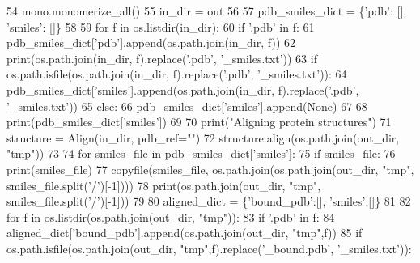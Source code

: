 \begin{DoxyCode}
54         mono.monomerize\_all()
55         in\_dir = out
56 
57     pdb\_smiles\_dict = \{\textcolor{stringliteral}{'pdb'}: [], \textcolor{stringliteral}{'smiles'}: []\}
58 
59     \textcolor{keywordflow}{for} f \textcolor{keywordflow}{in} os.listdir(in\_dir):
60         \textcolor{keywordflow}{if} \textcolor{stringliteral}{'.pdb'} \textcolor{keywordflow}{in} f:
61             pdb\_smiles\_dict[\textcolor{stringliteral}{'pdb'}].append(os.path.join(in\_dir, f))
62             print(os.path.join(in\_dir, f).replace(\textcolor{stringliteral}{'.pdb'}, \textcolor{stringliteral}{'\_smiles.txt'}))
63             \textcolor{keywordflow}{if} os.path.isfile(os.path.join(in\_dir, f).replace(\textcolor{stringliteral}{'.pdb'}, \textcolor{stringliteral}{'\_smiles.txt'})):
64                 pdb\_smiles\_dict[\textcolor{stringliteral}{'smiles'}].append(os.path.join(in\_dir, f).replace(\textcolor{stringliteral}{'.pdb'}, \textcolor{stringliteral}{'\_smiles.txt'}))
65             \textcolor{keywordflow}{else}:
66                 pdb\_smiles\_dict[\textcolor{stringliteral}{'smiles'}].append(\textcolor{keywordtype}{None})
67 
68     print(pdb\_smiles\_dict[\textcolor{stringliteral}{'smiles'}])
69 
70     print(\textcolor{stringliteral}{"Aligning protein structures"})
71     structure = Align(in\_dir, pdb\_ref=\textcolor{stringliteral}{""})
72     structure.align(os.path.join(out\_dir, \textcolor{stringliteral}{"tmp"}))
73 
74     \textcolor{keywordflow}{for} smiles\_file \textcolor{keywordflow}{in} pdb\_smiles\_dict[\textcolor{stringliteral}{'smiles'}]:
75         \textcolor{keywordflow}{if} smiles\_file:
76             print(smiles\_file)
77             copyfile(smiles\_file, os.path.join(os.path.join(out\_dir, \textcolor{stringliteral}{"tmp"}, smiles\_file.split(\textcolor{stringliteral}{'/'})[-1])))
78             print(os.path.join(out\_dir, \textcolor{stringliteral}{"tmp"}, smiles\_file.split(\textcolor{stringliteral}{'/'})[-1]))
79 
80     aligned\_dict = \{\textcolor{stringliteral}{'bound\_pdb'}:[], \textcolor{stringliteral}{'smiles'}:[]\}
81 
82     \textcolor{keywordflow}{for} f \textcolor{keywordflow}{in} os.listdir(os.path.join(out\_dir, \textcolor{stringliteral}{"tmp"})):
83         \textcolor{keywordflow}{if} \textcolor{stringliteral}{'.pdb'} \textcolor{keywordflow}{in} f:
84             aligned\_dict[\textcolor{stringliteral}{'bound\_pdb'}].append(os.path.join(out\_dir, \textcolor{stringliteral}{"tmp"},f))
85             \textcolor{keywordflow}{if} os.path.isfile(os.path.join(out\_dir, \textcolor{stringliteral}{"tmp"},f).replace(\textcolor{stringliteral}{'\_bound.pdb'}, \textcolor{stringliteral}{'\_smiles.txt'})):

\end{DoxyCode}
